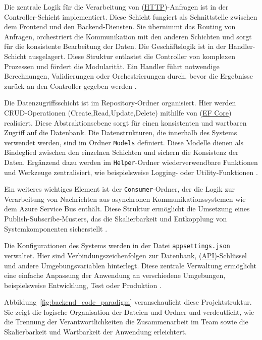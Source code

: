 Die zentrale Logik für die Verarbeitung von (\hyperref[abkuerzungen]{HTTP})-Anfragen ist in der Controller-Schicht implementiert. Diese Schicht fungiert als Schnittstelle zwischen dem Frontend und den Backend-Diensten. Sie übernimmt das Routing von Anfragen, orchestriert die Kommunikation mit den anderen Schichten und sorgt für die konsistente Bearbeitung der Daten. Die Geschäftslogik ist in der Handler-Schicht ausgelagert. Diese Struktur entlastet die Controller von komplexen Prozessen und fördert die Modularität. Ein Handler führt notwendige Berechnungen, Validierungen oder Orchestrierungen durch, bevor die Ergebnisse zurück an den Controller gegeben werden \cite{fowler2002patterns}.

Die Datenzugriffsschicht ist im Repository-Ordner organisiert. Hier werden CRUD-Operationen (Create,Read,Update,Delete) mithilfe von (\hyperref[abkuerzungen]{EF Core}) realisiert. Diese Abstraktionsebene sorgt für einen konsistenten und wartbaren Zugriff auf die Datenbank. Die Datenstrukturen, die innerhalb des Systems verwendet werden, sind im Ordner \texttt{Models} definiert. Diese Modelle dienen als Bindeglied zwischen den einzelnen Schichten und sichern die Konsistenz der Daten. Ergänzend dazu werden im \texttt{Helper}-Ordner wiederverwendbare Funktionen und Werkzeuge zentralisiert, wie beispielsweise Logging- oder Utility-Funktionen \cite{efCoreDocs2023}.

Ein weiteres wichtiges Element ist der \texttt{Consumer}-Ordner, der die Logik zur Verarbeitung von Nachrichten aus asynchronen Kommunikationssystemen wie dem Azure Service Bus enthält. Diese Struktur ermöglicht die Umsetzung eines Publish-Subscribe-Musters, das die Skalierbarkeit und Entkopplung von Systemkomponenten sicherstellt \cite{azureServiceBus2024}.

Die Konfigurationen des Systems werden in der Datei \texttt{appsettings.json} verwaltet. Hier sind Verbindungszeichenfolgen zur Datenbank, (\hyperref[abkuerzungen]{API})-Schlüssel und andere Umgebungsvariablen hinterlegt. Diese zentrale Verwaltung ermöglicht eine einfache Anpassung der Anwendung an verschiedene Umgebungen, beispielsweise Entwicklung, Test oder Produktion \cite{microsoftCloudDesignPatterns}.

Abbildung~\ref{fig:backend_code_paradigm} veranschaulicht diese Projektstruktur. Sie zeigt die logische Organisation der Dateien und Ordner und verdeutlicht, wie die Trennung der Verantwortlichkeiten die Zusammenarbeit im Team sowie die Skalierbarkeit und Wartbarkeit der Anwendung erleichtert.

